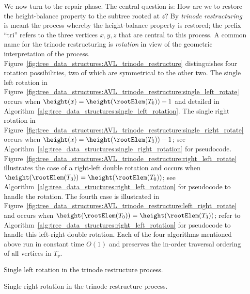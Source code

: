 We now turn to the repair phase. The central question is: How are we
to restore the height-balance property to the subtree rooted at $z$?
By \emph{trinode restructuring} is meant the process whereby the
height-balance property is restored; the prefix ``tri'' refers to the
three vertices $x,y,z$ that are central to this process. A common name
for the trinode restructuring is \emph{rotation} in view of the
geometric interpretation of the process.
Figure~\ref{fig:tree_data_structures:AVL_trinode_restructure}
distinguishes four rotation possibilities, two of which are
symmetrical to the other two. The single left rotation in
Figure~\ref{fig:tree_data_structures:AVL_trinode_restructure:single_left_rotate}
occurs when $\height(x) = \height(\rootElem(T_0)) + 1$ and detailed in
Algorithm~\ref{alg:tree_data_structures:single_left_rotation}. The
single right rotation in
Figure~\ref{fig:tree_data_structures:AVL_trinode_restructure:single_right_rotate}
occurs when $\height(x) = \height(\rootElem(T_3)) + 1$; see
Algorithm~\ref{alg:tree_data_structures:single_right_rotation} for
pseudocode.
Figure~\ref{fig:tree_data_structures:AVL_trinode_restructure:right_left_rotate}
illustrates the case of a right-left double rotation and occurs when
$\height(\rootElem(T_3)) = \height(\rootElem(T_0))$; see
Algorithm~\ref{alg:tree_data_structures:right_left_rotation} for
pseudocode to handle the rotation. The fourth case is illustrated in
Figure~\ref{fig:tree_data_structures:AVL_trinode_restructure:left_right_rotate}
and occurs when $\height(\rootElem(T_0)) = \height(\rootElem(T_3))$;
refer to Algorithm~\ref{alg:tree_data_structures:right_left_rotation}
for pseudocode to handle this left-right double rotation. Each of the
four algorithms mentioned above run in constant time $O(1)$ and
preserves the in-order traversal ordering of all vertices in $T_v$.

\begin{algorithm}[!htbp]

\caption{Single left rotation in the trinode restructure process.}
\label{alg:tree_data_structures:single_left_rotation}
\end{algorithm}

\begin{algorithm}[!htbp]

\caption{Single right rotation in the trinode restructure process.}
\label{alg:tree_data_structures:single_right_rotation}
\end{algorithm}

